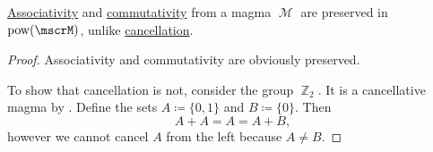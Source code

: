 \begin{proposition}\label{thm:power_set_magma_preservation}
  \hyperref[def:magma/associative]{Associativity} and \hyperref[def:magma/commutative]{commutativity} from a magma \( \mscrM \) are preserved in \( \pow(\mscrM) \), unlike \hyperref[def:magma/cancellative]{cancellation}.
\end{proposition}
\begin{proof}
  Associativity and commutativity are obviously preserved.

  To show that cancellation is not, consider the group \hyperref[def:group_of_integers_modulo]{\( \BbbZ_2 \)}. It is a cancellative magma by . Define the sets \( A \coloneqq \{ 0, 1 \} \) and \( B \coloneqq \{ 0 \} \). Then
  \begin{equation*}
    A + A = A = A + B,
  \end{equation*}
  however we cannot cancel \( A \) from the left because \( A \neq B \).
\end{proof}

